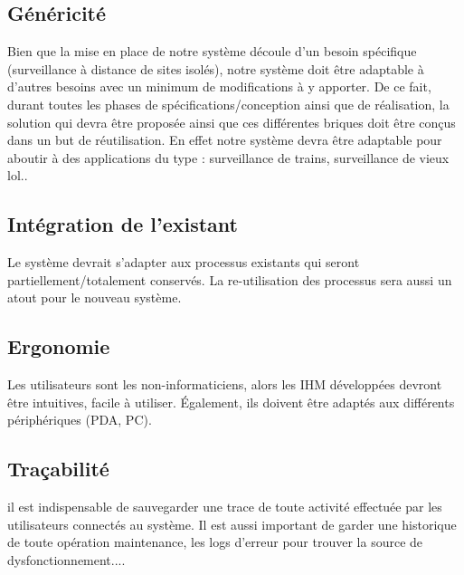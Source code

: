 \subsection{Généricité}
	Bien que la mise en place de notre système découle d'un besoin spécifique (surveillance à distance de sites 
isolés), notre système doit être adaptable à d'autres besoins avec un minimum de modifications à y apporter. De ce 
fait, durant toutes les phases de spécifications/conception ainsi que de réalisation, la solution qui devra être 
proposée ainsi que ces différentes briques doit être conçus dans un but de réutilisation. En effet notre système 
devra être adaptable pour aboutir à des applications du type : surveillance de trains, surveillance de vieux lol..

\subsection{Intégration de l'existant}
Le système devrait s'adapter aux processus existants qui seront partiellement/totalement conservés.
La re-utilisation des processus sera aussi un atout pour le nouveau système.

\subsection{Ergonomie}  
Les utilisateurs sont les non-informaticiens, alors les IHM développées devront être intuitives, facile à utiliser. Également, ils doivent être adaptés aux
différents périphériques (PDA, PC).   

\subsection{Traçabilité} 
il est indispensable de sauvegarder une trace de toute activité effectuée par les utilisateurs connectés
au système. Il est aussi important de garder une historique de toute opération maintenance, les logs d'erreur
pour trouver la source de dysfonctionnement....
